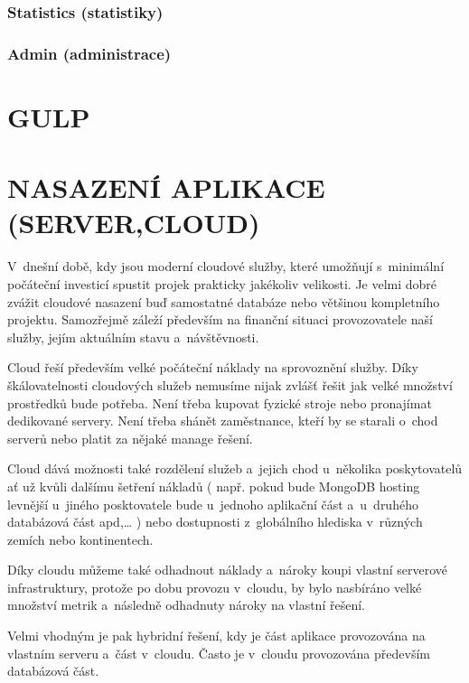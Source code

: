 \documentclass[a4paper,12pt,twoside,BCOR=10mm]{article}
\newcommand{\upc}[1]{\uppercase{#1}} %
\begin{document}
\subsubsection{Statistics (statistiky)}\label{sec:stats}
\subsubsection{Admin (administrace)}\label{sec:admin}


\section{\upc{Gulp}}

\section{\upc{Nasazení aplikace (server,cloud)}}
V~dnešní době, kdy jsou moderní cloudové služby, které umožňují s~minimální počáteční investicí spustit projek prakticky jakékoliv velikosti. Je velmi dobré zvážit cloudové nasazení buď samostatné databáze nebo většinou kompletního projektu. Samozřejmě záleží především na finanční situaci provozovatele naší služby, jejím aktuálním stavu a~návštěvnosti.

Cloud řeší především velké počáteční náklady na sprovoznění služby. Díky škálovatelnosti cloudových služeb nemusíme nijak zvlášť řešit jak velké množství prostředků bude potřeba. Není třeba kupovat fyzické stroje nebo pronajímat dedikované servery. Není třeba shánět zaměstnance, kteří by se starali o~chod serverů nebo platit za nějaké manage řešení.

Cloud dává možnosti také rozdělení služeb a~jejich chod u~několika poskytovatelů ať už kvůli dalšímu šetření nákladů ( např. pokud bude MongoDB hosting levnější u~jiného posktovatele bude u~jednoho aplikační část a~u~druhého databázová část apd,… ) nebo dostupnosti z~globálního hlediska v~různých zemích nebo kontinentech.

Díky cloudu můžeme také odhadnout náklady a~nároky koupi vlastní serverové infrastruktury, protože po dobu provozu v~cloudu, by bylo nasbíráno velké množství metrik a~následně odhadnuty nároky na vlastní řešení.

Velmi vhodným je pak hybridní řešení, kdy je část aplikace provozována na vlastním serveru a~část v~cloudu. Často je v~cloudu provozována především databázová část. 
\end{document}

